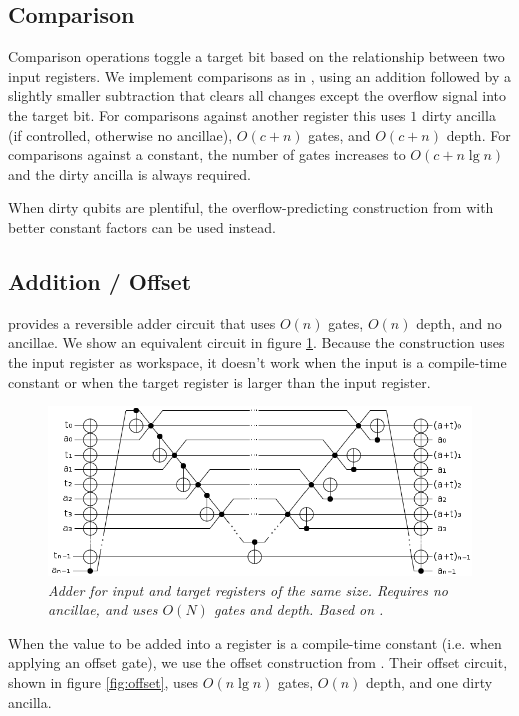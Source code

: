 \documentclass[twocolumn]{article}
\begin{document}
\subsection{Comparison}

Comparison operations toggle a target bit based on the relationship between two input registers.
We implement comparisons as in \cite{takahashi2005}, using an addition followed by a slightly smaller subtraction that clears all changes except the overflow signal into the target bit.
For comparisons against another register this uses $1$ dirty ancilla (if controlled, otherwise no ancillae), $O(c + n)$ gates, and $O(c + n)$ depth.
For comparisons against a constant, the number of gates increases to $O(c + n \lg n)$ and the dirty ancilla is always required.

When dirty qubits are plentiful, the overflow-predicting construction from \cite{haner2016} with better constant factors can be used instead.


\subsection{Addition / Offset}

\cite{takahashi2005} provides a reversible adder circuit that uses $O(n)$ gates, $O(n)$ depth, and no ancillae.
We show an equivalent circuit in figure \ref{fig:inlineadder}.
Because the construction uses the input register as workspace, it doesn't work when the input is a compile-time constant or when the target register is larger than the input register.

\begin{figure}
  \centering
  \includegraphics[width=\linewidth]{assets/inline-adder.png}
  \caption{\em Adder for input and target registers of the same size.
  Requires no ancillae, and uses $O(N)$ gates and depth.
  Based on \cite{van2004, takahashi2005}.}
  \label{fig:inlineadder}
\end{figure}

When the value to be added into a register is a compile-time constant (i.e. when applying an offset gate), we use the offset construction from \cite{haner2016}.
Their offset circuit, shown in figure \ref{fig:offset}, uses $O(n \lg n)$ gates, $O(n)$ depth, and one dirty ancilla.
\end{document}
